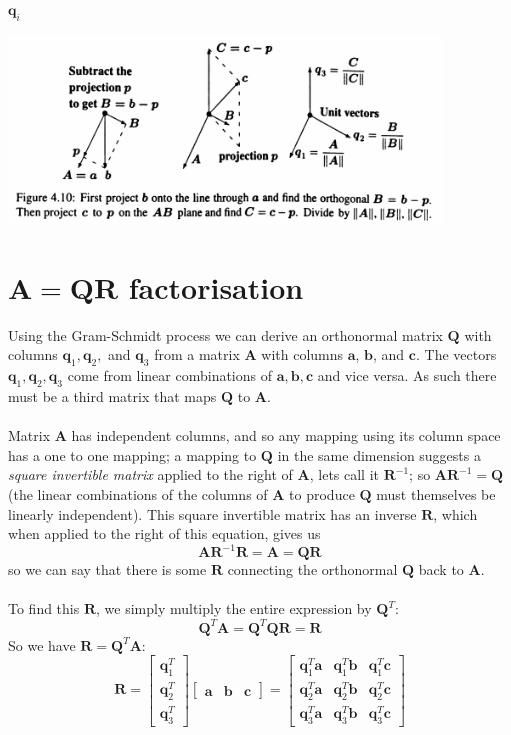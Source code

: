 \documentclass{report}
\begin{document}
$\bm q_i$
\begin{center}
\includegraphics[width=11.5cm]{89}
\end{center}
\newpage

\section{$\bm A=\bm{QR}$ factorisation}
Using the Gram-Schmidt process we can derive an orthonormal matrix $\bm Q$ with columns $\bm q_1,\bm q_2,$ and $\bm q_3$ from a matrix $\bm A$ with columns 
$\bm a$, $\bm b$, and $\bm c$. The vectors $\bm q_1,\bm q_2,\bm q_3$ come from linear combinations of $\bm a,\bm b,\bm c$ and vice versa. As such there must be a third matrix
that maps $\bm Q$ to $\bm A$.\\ 
\vspace{1mm}\\
Matrix $\bm A$ has independent columns, and so any mapping using its column space has a one to one mapping; a mapping to $\bm Q$ in the same 
dimension suggests a \textit{square invertible matrix} applied to the right of $\bm A$, lets call it $\bm R^{-1}$; so $\bm{AR}^{-1}=\bm Q$ (the linear combinations of the 
columns of $\bm A$ to produce $\bm Q$ must themselves be linearly independent). This square
invertible matrix has an inverse $\bm R$, which when applied to the right of this equation, gives us
\begin{equation*}
\bm{AR}^{-1}\bm R=\bm A=\bm Q\bm R
\end{equation*}
so we can say that there is some $\bm R$ connecting the orthonormal $\bm Q$ back to $\bm A$.\\
\vspace{1mm}\\
To find this $\bm R$, we simply multiply the entire expression by $\bm Q^T$:
\begin{equation*}
\bm Q^T\bm A=\bm Q^T\bm{QR}=\bm R
\end{equation*}
So we have $\bm R=\bm Q^T\bm A$:
\begin{equation*}
\bm R=\left[\begin{array}{c}
\bm q_1^T\\\bm q_2^T\\\bm q_3^T
\end{array}\right]\left[
\begin{array}{ccc}
\bm a&\bm b&\bm c\end{array}\right]=\left[\begin{array}{ccc}
\bm q_1^T\bm a&\bm q_1^T\bm b&\bm q_1^T\bm c\\
\bm q_2^T\bm a&\bm q_2^T\bm b&\bm q_2^T\bm c\\
\bm q_3^T\bm a&\bm q_3^T\bm b&\bm q_3^T\bm c
\end{array}\right]
\end{equation*}
\end{document}
